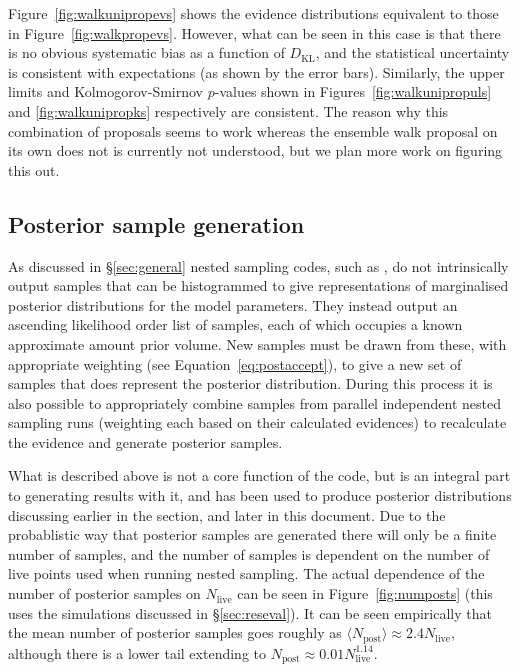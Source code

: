 Figure~\ref{fig:walkunipropevs} shows the evidence distributions equivalent to those in Figure~\ref{fig:walkpropevs}. However, what can
be seen in this case is that there is no obvious systematic bias as a function of $D_{\text{KL}}$, and the statistical uncertainty is
consistent with expectations (as shown by the error bars). Similarly, the upper limits and Kolmogorov-Smirnov $p$-values shown in
Figures~\ref{fig:walkunipropuls} and \ref{fig:walkunipropks} respectively are consistent. The reason why this combination of proposals
seems to work whereas the ensemble walk proposal on its own does not is currently not understood, but we plan more work on figuring this
out.

\subsection{Posterior sample generation}\label{sec:postsamps}

As discussed in \S\ref{sec:general} nested sampling codes, such as \lppen, do not intrinsically output samples that can be histogrammed to give
representations of marginalised posterior distributions for the model parameters. They instead output an ascending likelihood order list of samples,
each of which occupies a known approximate amount prior volume. New samples must be drawn from these, with appropriate weighting (see Equation~\ref{eq:postaccept}),
to give a new set of samples that does represent the posterior distribution. During this process it is also possible to appropriately combine samples from parallel
independent nested sampling runs (weighting each based on their calculated evidences) to recalculate the evidence and generate posterior samples.

What is described above is not a core function of the \lppen code, but is an integral part to generating results with it, and has been used to
produce posterior distributions discussing earlier in the section, and later in this document. Due to the probablistic
way that posterior samples are generated there will only be a finite number of samples, and the number of samples is dependent on the number
of live points used when running nested sampling. The actual dependence of the number of posterior samples on $N_{\text{live}}$ can be seen in
Figure~\ref{fig:numposts} (this uses the simulations discussed in \S\ref{sec:reseval}). It can be seen empirically that the mean number of posterior
samples goes roughly as $\langle N_{\text{post}} \rangle \approx 2.4N_{\text{live}}$, although there is a lower tail extending to $N_{\text{post}} \approx
0.01N_{\text{live}}^{1.14}$.

